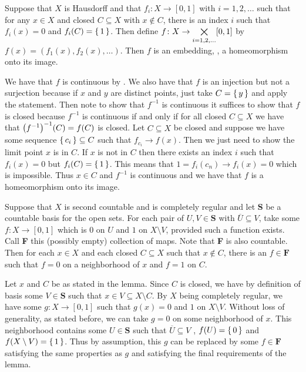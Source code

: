 \documentclass[letterpaper, 11pt]{article}
\begin{document}
\begin{lem}\label{lem: Hausdorff_and_comp_reg-ish_embedding}
  Suppose that $X$ is Hausdorff and that $f_{i}\colon X \to [0, 1]$ with $i = 1, 2, \ldots$ such that for any $x \in X$ and closed $C \subseteq X$ with $x \notin C$, there is an index $i$ such that $f_{i}(x) = 0$ and $f_{i}(C) = \set{1}$.
  Then define $f\colon X \to \bigtimes\limits_{i = 1, 2, \ldots} [0, 1]$ by $f(x) = (f_{1}(x), f_{2}(x), \ldots)$.
  Then $f$ is an embedding, \ie, a homeomorphism onto its image.
\end{lem}
\begin{pf}
  We have that $f$ is continuous by .
  We also have that $f$ is an injection but not a surjection because if $x$ and $y$ are distinct points, just take $C = \set{y}$ and apply the statement.
  Then note to show that $f^{-1}$ is continuous it suffices to show that $f$ is closed because $f^{-1}$ is continuous if and only if for all closed $C \subseteq X$ we have that $\pqty{f^{-1}}^{-1}(C) = f(C)$ is closed.
  Let $C \subseteq X$ be closed and suppose we have some sequence $\set{c_{i}} \subseteq C$ such that $f_{c_{i}} \to f(x)$.
  Then we just need to show the limit point $x$ is in $C$.
  If $x$ is not in $C$ then there exists an index $i$ such that $f_{i}(x) = 0$ but $f_{i}(C) = \set{1}$.
  This means that $1 = f_{i}(c_{n}) \to f_{i}(x) = 0$ which is impossible.
  Thus $x \in C$ and $f^{-1}$ is continuous and we have that $f$ is a homeomorphism onto its image.
\end{pf}

\clearpage

\begin{lem}\label{lem: second_count_comp_reg_family_F}
  Suppose that $X$ is second countable and is completely regular and let \textbf{S} be a countable basis for the open sets.
  For each pair of $U, V \in \textbf{S}$ with $\overline{U} \subseteq V$, take some $f\colon X \to [0, 1]$ which is $0$ on $U$ and $1$ on $X \setminus V$, provided such a function exists.
  Call \textbf{F} this (possibly empty) collection of maps.
  Note that \textbf{F} is also countable.
  Then for each $x \in X$ and each closed $C \subseteq X$ such that $x \notin C$, there is an $f \in \textbf{F}$ such that $f = 0$ on a neighborhood of $x$ and $f = 1$ on $C$.
\end{lem}
\begin{pf}
  Let $x$ and $C$ be as stated in the lemma.
  Since $C$ is closed, we have by definition of basis some $V \in \textbf{S}$ such that $x \in V \subseteq X \setminus C$.
  By $X$ being completely regular, we have some $g\colon X \to [0, 1]$ such that $g(x) = 0$ and $1$ on $X \setminus V$.
  Without loss of generality, as stated before, we can take $g = 0$ on some neighborhood of $x$.
  This neighborhood contains some $U \in \textbf{S}$ such that $\overline{U} \subseteq V$ , $f(U) = \set{0}$ and $f(X \setminus V) = \set{1}$.
  Thus by assumption, this $g$ can be replaced by some $f \in \textbf{F}$ satisfying the same properties as $g$ and satisfying the final requirements of the lemma.
\end{pf}
\end{document}
